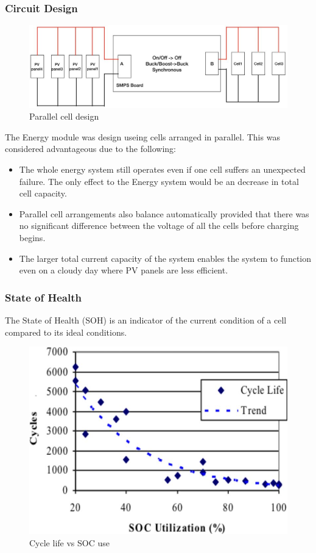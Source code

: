 \documentclass[11pt, a4paper]{article}
\begin{document}
\subsubsection{Circuit Design}

\begin{figure} [h!]
    \centering
    \includegraphics[scale=0.5]{Energy_parallel.JPG}
    \caption{Parallel cell design}
\end{figure}
The Energy module was design useing cells arranged in parallel. This was considered advantageous due to the following:
\begin{itemize}
    \item The whole energy system still operates even if one cell suffers an unexpected failure. The only effect to the Energy system would be an decrease in total cell capacity.
    \item Parallel cell arrangements also balance automatically provided that there was no significant difference between the voltage of all the cells before charging begins.
    \item The larger total current capacity of the system enables the system to function even on a cloudy day where PV panels are less efficient.
\end{itemize}

\subsubsection{State of Health}

The State of Health (SOH) is an indicator of the current condition of a cell compared to its ideal conditions. 
\begin{figure} [h!]
    \centering
    \includegraphics[scale=0.4]{Energy_SOH.JPG}
    \caption{Cycle life vs SOC use \cite{SOH}}
\end{figure}
\end{document}
